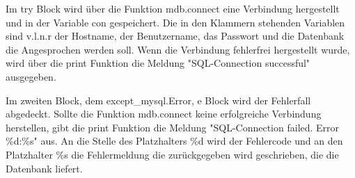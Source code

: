 \noindent Im try Block wird über die Funktion mdb.connect eine Verbindung hergestellt und in der Variable con \label{con} gespeichert. Die in den Klammern stehenden Variablen sind v.l.n.r der Hostname, der Benutzername, das Passwort und die Datenbank die Angesprochen werden soll. Wenn die Verbindung fehlerfrei hergestellt wurde, wird über die print Funktion die Meldung "SQL-Connection successful" ausgegeben.

\noindent Im zweiten Block, dem except\_mysql.Error, e Block wird der Fehlerfall abgedeckt. Sollte die Funktion mdb.connect keine erfolgreiche Verbindung herstellen, gibt die print Funktion die Meldung "SQL-Connection failed. Error \%d:\%s" aus. An die Stelle des Platzhalters \%d wird der Fehlercode und an den Platzhalter \%s die Fehlermeldung die zurückgegeben wird geschrieben, die die Datenbank liefert.

